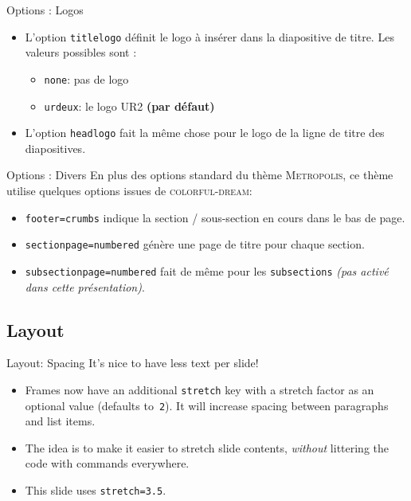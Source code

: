\documentclass[10pt]{beamer}
\begin{document}
\begin{frame}[stretch]{Options : Logos}
  \begin{itemize}
    \item L'option \texttt{titlelogo} définit le logo à insérer dans la diapositive de titre.  Les valeurs possibles sont :
    \begin{itemize}
        \item \texttt{none}: pas de logo
        \item \texttt{urdeux}: le logo UR2 \alert{\bf (par défaut)}
    \end{itemize}
    \item L'option \texttt{headlogo} fait la même chose pour le logo de la ligne de titre des diapositives.
  \end{itemize}
\end{frame}

\begin{frame}{Options : Divers}
  En plus des options standard du thème \textsc{Metropolis}, ce thème utilise quelques options issues de \textsc{colorful-dream}:

  \begin{itemize}
    \item \texttt{footer=crumbs} indique la section / sous-section en cours dans le bas de page.
    \item \texttt{sectionpage=numbered} génère une page de titre pour chaque section.
    \item \texttt{subsectionpage=numbered} fait de même pour les \texttt{subsections} \textit{(pas activé dans cette présentation)}.
  \end{itemize}
\end{frame}

\subsection{Layout}

\begin{frame}[fragile,stretch=3.5]{Layout: Spacing}
It's nice to have less text per slide!

\begin{itemize}
    \item Frames now have an additional \alert{\texttt{stretch}} key with a stretch factor as an optional value (defaults to~\texttt{2}).  It will \alert{increase spacing} between paragraphs and list items.

    \item The idea is to make it easier to stretch slide contents, \emph{without} littering the code with \texttt{\vspace{...}} commands everywhere.

    \item This slide uses \texttt{stretch=3.5}.
\end{itemize}

\end{frame}
\end{document}
